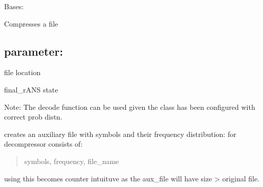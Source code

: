 \documentclass[letterpaper,10pt,english]{sphinxmanual}
\begin{document}
\begin{fulllineitems}
\label{\detokenize{file_compressor:file_compressor.FileCompressor}}
\pysigstartsignatures
{}
\pysigstopsignatures
\sphinxAtStartPar
Bases: 

\sphinxAtStartPar
Compresses a file


\subsection{parameter:}
\label{\detokenize{file_compressor:parameter}}\begin{description}
\sphinxAtStartPar
file location

\sphinxAtStartPar
final\_rANS state

\end{description}

\sphinxAtStartPar
Note: The decode function can be used given the class has been configured with correct prob distn.

\begin{fulllineitems}
\label{\detokenize{file_compressor:file_compressor.FileCompressor.create_aux_file}}
\pysigstartsignatures
{}
\pysigstopsignatures
\sphinxAtStartPar
creates an auxiliary file with symbols and their frequency distribution: for decompressor
consists of:
\begin{quote}

\sphinxAtStartPar
symbols, frequency, file\_name
\end{quote}

\sphinxAtStartPar
using this becomes counter intuituve as the aux\_file will have size \textgreater{} original file.

\end{fulllineitems}


\begin{fulllineitems}
\label{\detokenize{file_compressor:file_compressor.FileCompressor.decode}}
\pysigstartsignatures
{}
\pysigstopsignatures
\end{fulllineitems}


\end{fulllineitems}
\end{document}
